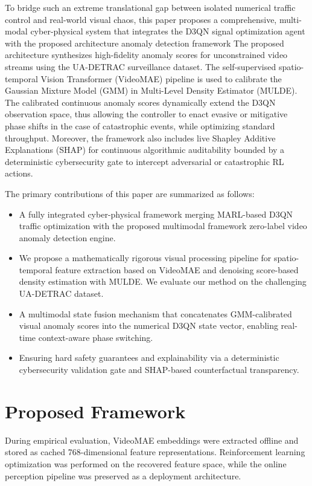 \documentclass[conference]{IEEEtran}
\begin{document}
To bridge such an extreme translational gap between isolated numerical traffic control and real-world visual chaos, this paper proposes a comprehensive, multi-modal cyber-physical system that integrates the D3QN signal optimization agent with the proposed architecture anomaly detection framework The proposed architecture synthesizes high-fidelity anomaly scores for unconstrained video streams using the UA-DETRAC surveillance dataset. The self-supervised spatio-temporal Vision Transformer (VideoMAE) pipeline is used to calibrate the Gaussian Mixture Model (GMM) in Multi-Level Density Estimator (MULDE). The calibrated continuous anomaly scores dynamically extend the D3QN observation space, thus allowing the controller to enact evasive or mitigative phase shifts in the case of catastrophic events, while optimizing standard throughput. Moreover, the framework also includes live Shapley Additive Explanations (SHAP) for continuous algorithmic auditability bounded by a deterministic cybersecurity gate to intercept adversarial or catastrophic RL actions.

The primary contributions of this paper are summarized as follows:
\begin{itemize}
    \item A fully integrated cyber-physical framework merging MARL-based D3QN traffic optimization with the proposed multimodal framework zero-label video anomaly detection engine.
    \item We propose a mathematically rigorous visual processing pipeline for spatio-temporal feature extraction based on VideoMAE and denoising score-based density estimation with MULDE. We evaluate our method on the challenging UA-DETRAC dataset.
    \item A multimodal state fusion mechanism that concatenates GMM-calibrated visual anomaly scores into the numerical D3QN state vector, enabling real-time context-aware phase switching.
    \item Ensuring hard safety guarantees and explainability via a deterministic cybersecurity validation gate and SHAP-based counterfactual transparency.
\end{itemize}

\section{Proposed Framework}

During empirical evaluation, VideoMAE embeddings were extracted offline and stored as cached 768-dimensional feature representations. Reinforcement learning optimization was performed on the recovered feature space, while the online perception pipeline was preserved as a deployment architecture.
\end{document}

